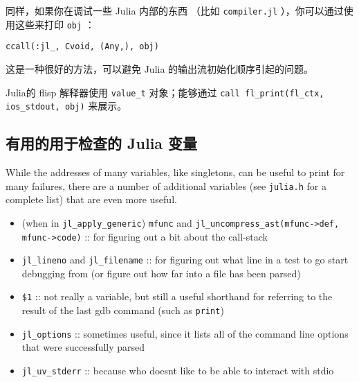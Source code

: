 同样，如果你在调试一些 Julia 内部的东西 （比如 \texttt{compiler.jl} ），你可以通过使用这些来打印 \texttt{obj} ：




\begin{verbatim}
ccall(:jl_, Cvoid, (Any,), obj)
\end{verbatim}



这是一种很好的方法，可以避免 Julia 的输出流初始化顺序引起的问题。



Julia的 flisp 解释器使用 \texttt{value\_t} 对象；能够通过  \texttt{call fl\_print(fl\_ctx, ios\_stdout, obj)} 来展示。



\hypertarget{1284180401016634793}{}


\subsection{有用的用于检查的 Julia 变量}



While the addresses of many variables, like singletons, can be useful to print for many failures, there are a number of additional variables (see \texttt{julia.h} for a complete list) that are even more useful.



\begin{itemize}
\item (when in \texttt{jl\_apply\_generic}) \texttt{mfunc} and \texttt{jl\_uncompress\_ast(mfunc->def, mfunc->code)} :: for figuring out a bit about the call-stack


\item \texttt{jl\_lineno} and \texttt{jl\_filename} :: for figuring out what line in a test to go start debugging from (or figure out how far into a file has been parsed)


\item \texttt{\$1} :: not really a variable, but still a useful shorthand for referring to the result of the last gdb command (such as \texttt{print})


\item \texttt{jl\_options} :: sometimes useful, since it lists all of the command line options that were successfully parsed


\item \texttt{jl\_uv\_stderr} :: because who doesn{\textquotesingle}t like to be able to interact with stdio

\end{itemize}


